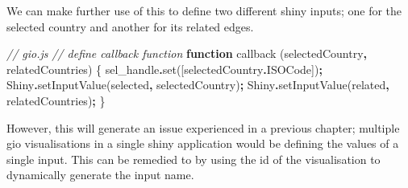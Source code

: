 \documentclass[
]{krantz}
\makeatletter
\newenvironment{Shaded}{\begin{snugshade}}{\end{snugshade}}
\newcommand{\AttributeTok}[1]{\textcolor[rgb]{0.61,0.61,0.61}{#1}}
\newcommand{\CommentTok}[1]{\textcolor[rgb]{0.37,0.37,0.37}{\textit{#1}}}
\newcommand{\FunctionTok}[1]{\textcolor[rgb]{0,0,0}{#1}}
\newcommand{\KeywordTok}[1]{\textcolor[rgb]{0.27,0.27,0.27}{\textbf{#1}}}
\newcommand{\NormalTok}[1]{#1}
\newcommand{\OperatorTok}[1]{\textcolor[rgb]{0.43,0.43,0.43}{\textbf{#1}}}
\newcommand{\StringTok}[1]{\textcolor[rgb]{0.5,0.5,0.5}{#1}}
\newenvironment{kframe}{%
\medskip{}
\setlength{\fboxsep}{.8em}
 \def\at@end@of@kframe{}%
 \ifinner\ifhmode%
  \def\at@end@of@kframe{\end{minipage}}%
  \begin{minipage}{\columnwidth}%
 \fi\fi%
 \def\FrameCommand##1{\hskip\@totalleftmargin \hskip-\fboxsep
 \colorbox{shadecolor}{##1}\hskip-\fboxsep
     \hskip-\linewidth \hskip-\@totalleftmargin \hskip\columnwidth}%
 \MakeFramed {\advance\hsize-\width
   \@totalleftmargin\z@ \linewidth\hsize
   \@setminipage}}%
 {\par\unskip\endMakeFramed%
 \at@end@of@kframe}
\renewenvironment{Shaded}{\begin{kframe}}{\end{kframe}}
\makeatother
\begin{document}
We can make further use of this to define two different shiny inputs; one for the selected country and another for its related edges.

\begin{Shaded}
\begin{Highlighting}[]
\CommentTok{// gio.js}
\CommentTok{// define callback function}
\KeywordTok{function} \FunctionTok{callback}\NormalTok{ (selectedCountry}\OperatorTok{,}\NormalTok{ relatedCountries) \{}
\NormalTok{  sel\_handle}\OperatorTok{.}\FunctionTok{set}\NormalTok{([selectedCountry}\OperatorTok{.}\AttributeTok{ISOCode}\NormalTok{])}\OperatorTok{;}
\NormalTok{  Shiny}\OperatorTok{.}\FunctionTok{setInputValue}\NormalTok{(}\StringTok{\textquotesingle{}selected\textquotesingle{}}\OperatorTok{,}\NormalTok{ selectedCountry)}\OperatorTok{;}
\NormalTok{  Shiny}\OperatorTok{.}\FunctionTok{setInputValue}\NormalTok{(}\StringTok{\textquotesingle{}related\textquotesingle{}}\OperatorTok{,}\NormalTok{ relatedCountries)}\OperatorTok{;}
\NormalTok{\}}
\end{Highlighting}
\end{Shaded}

However, this will generate an issue experienced in a previous chapter; multiple gio visualisations in a single shiny application would be defining the values of a single input. This can be remedied to by using the id of the visualisation to dynamically generate the input name.
\end{document}
